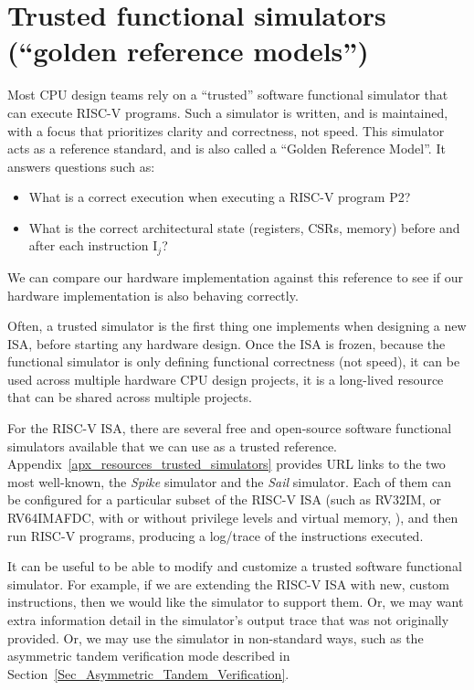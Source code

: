 \section{Trusted functional simulators (``golden reference models'')}


Most CPU design teams rely on a ``trusted'' software functional
simulator that can execute RISC-V programs.  Such a simulator is
written, and is maintained, with a focus that prioritizes clarity and
correctness, not speed.  This simulator acts as a reference standard,
and is also called a ``Golden Reference Model''.  It answers questions
such as:

\begin{itemize}
 \item What is a correct execution when executing a RISC-V program P2?

 \item What is the correct architectural state (registers, CSRs, memory) before
     and after each instruction I$_j$?

\end{itemize}

We can compare our hardware implementation against this reference to
see if our hardware implementation is also behaving correctly.

Often, a trusted simulator is the first thing one implements when
designing a new ISA, before starting any hardware design.  Once the
ISA is frozen, because the functional simulator is only defining
functional correctness (not speed), it can be used across multiple
hardware CPU design projects, {\ie} it is a long-lived resource that
can be shared across multiple projects.

For the RISC-V ISA, there are several free and open-source software
functional simulators available that we can use as a trusted
reference.  Appendix~\ref{apx_resources_trusted_simulators} provides
URL links to the two most well-known, the \emph{Spike} simulator and
the \emph{Sail} simulator.  Each of them can be configured for a
particular subset of the RISC-V ISA (such as RV32IM, or RV64IMAFDC,
with or without privilege levels and virtual memory, {\etc}), and then
run RISC-V programs, producing a log/trace of the instructions
executed.

It can be useful to be able to modify and customize a trusted software
functional simulator.  For example, if we are extending the RISC-V ISA
with new, custom instructions, then we would like the simulator to
support them.  Or, we may want extra information detail in the
simulator's output trace that was not originally provided.
Or, we may use the simulator in non-standard ways, such
as the asymmetric tandem verification mode described in
Section~\ref{Sec_Asymmetric_Tandem_Verification}.

